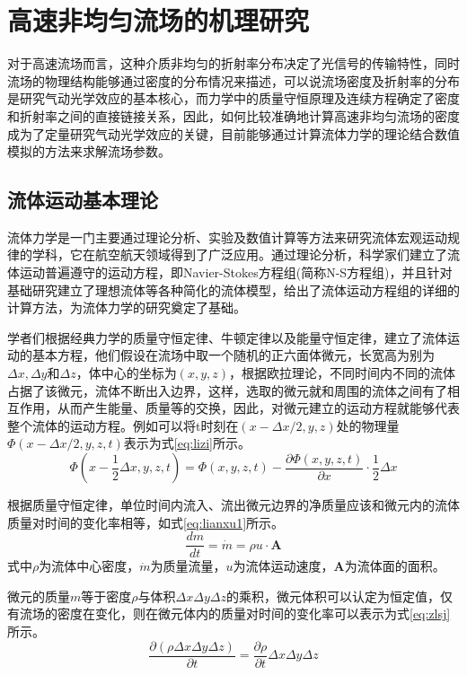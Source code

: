 \chapter{高速非均匀流场的机理研究}
对于高速流场而言，这种介质非均匀的折射率分布决定了光信号的传输特性，同时流场的物理结构能够通过密度的分布情况来描述，可以说流场密度及折射率的分布是研究气动光学效应的基本核心，而力学中的质量守恒原理及连续方程确定了密度和折射率之间的直接链接关系，因此，如何比较准确地计算高速非均匀流场的密度成为了定量研究气动光学效应的关键，目前能够通过计算流体力学的理论结合数值模拟的方法来求解流场参数。
\section{流体运动基本理论}
流体力学是一门主要通过理论分析、实验及数值计算等方法来研究流体宏观运动规律的学科，它在航空航天领域得到了广泛应用。通过理论分析，科学家们建立了流体运动普遍遵守的运动方程，即Navier-Stokes方程组(简称N-S方程组)，并且针对基础研究建立了理想流体等各种简化的流体模型，给出了流体运动方程组的详细的计算方法，为流体力学的研究奠定了基础。

学者们根据经典力学的质量守恒定律、牛顿定律以及能量守恒定律，建立了流体运动的基本方程，他们假设在流场中取一个随机的正六面体微元，长宽高为别为$\Delta x,\Delta y$和$\Delta z$，体中心的坐标为$(x,y,z)$，根据欧拉理论，不同时间内不同的流体占据了该微元，流体不断出入边界，这样，选取的微元就和周围的流体之间有了相互作用，从而产生能量、质量等的交换，因此，对微元建立的运动方程就能够代表整个流体的运动方程。例如可以将t时刻在$(x-\Delta x/2,y,z)$处的物理量$\Phi(x-\Delta x/2,y,z,t)$表示为式\eqref{eq:lizi}所示。
\begin{equation}
\Phi(x-\frac{1}{2}\Delta x,y,z,t)=\Phi(x,y,z,t)-\frac{\partial\Phi(x,y,z,t)}{\partial x}\cdot\frac{1}{2}\Delta x
\label{eq:lizi}
\end{equation}

根据质量守恒定律，单位时间内流入、流出微元边界的净质量应该和微元内的流体质量对时间的变化率相等，如式\eqref{eq:lianxu1}所示。
\begin{equation}
\frac{dm}{dt}=\dot{m}=\rho u\cdot\mathbf{A}
\label{eq:lianxu1}
\end{equation}
式中$\rho$为流体中心密度，$\dot{m}$为质量流量，$u$为流体运动速度，$\mathbf{A}$为流体面的面积。

微元的质量$m$等于密度$\rho$与体积$\Delta x\Delta y\Delta z$的乘积，微元体积可以认定为恒定值，仅有流场的密度在变化，则在微元体内的质量对时间的变化率可以表示为式\eqref{eq:zlsj}所示。
\begin{equation}
\frac{\partial(\rho\Delta x\Delta y\Delta z)}{\partial t}=\frac{\partial\rho}{\partial t}\Delta x\Delta y\Delta z
\label{eq:zlsj}
\end{equation}


